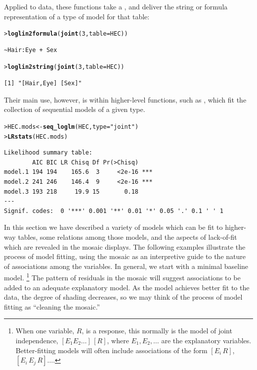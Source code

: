 \documentclass[10pt,krantz2]{krantz}\usepackage[]{graphicx}\usepackage[]{color}
\makeatletter
\newcommand{\hlnum}[1]{\textcolor[rgb]{0.686,0.059,0.569}{#1}}%
\newcommand{\hlstr}[1]{\textcolor[rgb]{0.192,0.494,0.8}{#1}}%
\newcommand{\hlstd}[1]{\textcolor[rgb]{0.345,0.345,0.345}{#1}}%
\newcommand{\hlkwb}[1]{\textcolor[rgb]{0.69,0.353,0.396}{#1}}%
\newcommand{\hlkwc}[1]{\textcolor[rgb]{0.333,0.667,0.333}{#1}}%
\newcommand{\hlkwd}[1]{\textcolor[rgb]{0.737,0.353,0.396}{\textbf{#1}}}%
\newenvironment{kframe}{%
 \def\at@end@of@kframe{}%
 \ifinner\ifhmode%
  \def\at@end@of@kframe{\end{minipage}}%
  \begin{minipage}{\columnwidth}%
 \fi\fi%
 \def\FrameCommand##1{\hskip\@totalleftmargin \hskip-\fboxsep
 \colorbox{shadecolor}{##1}\hskip-\fboxsep
     \hskip-\linewidth \hskip-\@totalleftmargin \hskip\columnwidth}%
 \MakeFramed {\advance\hsize-\width
   \@totalleftmargin\z@ \linewidth\hsize
   \@setminipage}}%
 {\par\unskip\endMakeFramed%
 \at@end@of@kframe}
\newenvironment{knitrout}{}{} %
\renewenvironment{knitrout}{\small\renewcommand{\baselinestretch}{.85}}{} %
\makeatother
\begin{document}
Applied to data, these functions take a , and deliver
the string or formula representation of a type of model for that table:
\begin{knitrout}
\color{fgcolor}\begin{kframe}
\begin{alltt}
\hlstd{> }\hlkwd{loglin2formula}\hlstd{(}\hlkwd{joint}\hlstd{(}\hlnum{3}\hlstd{,} \hlkwc{table} \hlstd{= HEC))}
\end{alltt}
\begin{verbatim}
~Hair:Eye + Sex
\end{verbatim}
\begin{alltt}
\hlstd{> }\hlkwd{loglin2string}\hlstd{(}\hlkwd{joint}\hlstd{(}\hlnum{3}\hlstd{,} \hlkwc{table} \hlstd{= HEC))}
\end{alltt}
\begin{verbatim}
[1] "[Hair,Eye] [Sex]"
\end{verbatim}
\end{kframe}
\end{knitrout}
Their main use, however, is within higher-level functions,
such as , which fit the collection of sequential models
of a given type.
\begin{knitrout}
\color{fgcolor}\begin{kframe}
\begin{alltt}
\hlstd{> }\hlstd{HEC.mods} \hlkwb{<-} \hlkwd{seq_loglm}\hlstd{(HEC,} \hlkwc{type} \hlstd{=} \hlstr{"joint"}\hlstd{)}
\hlstd{> }\hlkwd{LRstats}\hlstd{(HEC.mods)}
\end{alltt}
\begin{verbatim}
Likelihood summary table:
        AIC BIC LR Chisq Df Pr(>Chisq)    
model.1 194 194    165.6  3     <2e-16 ***
model.2 241 246    146.4  9     <2e-16 ***
model.3 193 218     19.9 15       0.18    
---
Signif. codes:  0 '***' 0.001 '**' 0.01 '*' 0.05 '.' 0.1 ' ' 1
\end{verbatim}
\end{kframe}
\end{knitrout}

In this section we have described a variety of models which can be fit
to higher-way tables, some relations among those models, and the aspects
of lack-of-fit which are revealed in the mosaic displays.
The following examples illustrate the process of model fitting,
using the mosaic as an interpretive guide to the nature of associations
among the variables.
In general, we start with a minimal baseline model.%
%
\footnote{When one variable, $R$,
is a response, this normally is the model of joint independence,
\([E_1 E_2 \dots] \, [R]\), where \(E_1, E_2, \dots\) are the explanatory
variables.  Better-fitting models will often include associations
of the form \([E_i \, R]\), \([E_i \, E_j \, R] \dots \).
}
The pattern of residuals in the mosaic will suggest associations to be added
to an adequate explanatory model.
As the model achieves better fit to the data, the degree of shading
decreases, so we may think of the process of model fitting as
``cleaning the mosaic.''
\end{document}
